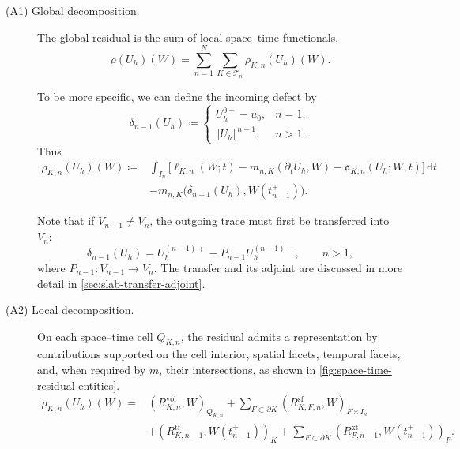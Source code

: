 \begin{description}
  \item[(A1) Global decomposition.] The global residual is the sum of local space--time functionals,
  \begin{equation}
    \rho(U_h)(W)
    =
    \sum_{n=1}^{N}
    \sum_{K\in\mathcal T_n}
    \rho_{K,n}(U_h)(W).
    \label{eq:space-time-residual-decomposition}
  \end{equation}

To be more specific, we can define the incoming defect by
\begin{equation}
  \delta_{n-1}(U_h)\coloneqq
  \begin{cases}
    U_h^{0+}-u_0, & n=1,\\[0.3em]
    \llbracket U_h \rrbracket^{n-1}, & n>1.
  \end{cases}
  \label{eq:dg-incoming-defect}
\end{equation}
Thus
\begin{equation}
  \begin{aligned}
  \rho_{K,n}(U_h)(W)
  \coloneqq{}&
  \int_{I_n}
  \Big[
    \ell_{K,n}(W;t)
    -
    m_{n,K}(\partial_tU_h,W)
    -
    \mathfrak a_{K,n}(U_h;W,t)
  \Big]\,\mathrm dt
  \\
  &-
  m_{n,K}\Big(
    \delta_{n-1}(U_h),
    W(t_{n-1}^{+})
  \Big).
  \end{aligned}
  \label{eq:complete-local-slab-residual}
\end{equation}

Note that if \(V_{n-1}\ne V_n\), the outgoing trace must first be transferred into \(V_n\):
\begin{equation}
  \delta_{n-1}(U_h)
  =U_h^{(n-1)+}-P_{n-1}U_h^{(n-1)-},
  \qquad n>1,
  \label{eq:transferred-dg-time-defect}
\end{equation}
where \(P_{n-1}:V_{n-1}\to V_n\). The transfer and its adjoint are discussed in more detail in \cref{sec:slab-transfer-adjoint}.

  \item[(A2) Local decomposition.] On each space--time cell \(Q_{K,n}\), the residual admits a representation by contributions supported on the cell interior, spatial facets, temporal facets, and, when required by $m$, their intersections, as shown in \cref{fig:space-time-residual-entities}.
  \begin{equation}
    \begin{aligned}
    \rho_{K,n}(U_h)(W)
    ={}&
    (R_{K,n}^{\mathrm{vol}},W)_{Q_{K,n}}
    +
    \sum_{F\subset\partial K}
    (R_{K,F,n}^{\mathrm{sf}},W)_{F\times I_n}
    \\
    &+
    (R_{K,n-1}^{\mathrm{tf}},W(t_{n-1}^{+}))_{K} +
    \sum_{F\subset\partial K}
    (R_{F,n-1}^{\mathrm{xt}},
      W(t_{n-1}^{+}))_{F}.
    \end{aligned}
    \label{eq:space-time-entity-representation}
  \end{equation}


\end{description}
